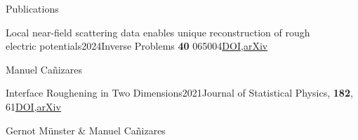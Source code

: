 \documentclass{resume} %
\begin{document}
\begin{rSection}{Publications}
    \begin{rSubsectionNoBullet}{Local near-field scattering data enables unique reconstruction of rough\\ electric potentials}{2024}{Inverse Problems \textbf{\textrm{40}} \textrm{065004}}{\href{https://doi.org/10.1088/1361-6420/ad3eaa}{DOI},\href{https://arxiv.org/abs/2311.09036}{arXiv}}
        \item Manuel Ca\~nizares
    \end{rSubsectionNoBullet}
    \begin{rSubsectionNoBullet}{Interface Roughening in Two Dimensions}{2021}{Journal of Statistical Physics, \textbf{182}, 61}{\href{https://doi.org/10.1007/s10955-021-02738-w}{DOI},\href{https://arxiv.org/abs/2004.13807}{arXiv}}
        \item Gernot M\"unster \& Manuel Ca\~nizares
    \end{rSubsectionNoBullet}
    
\end{rSection}
\end{document}
